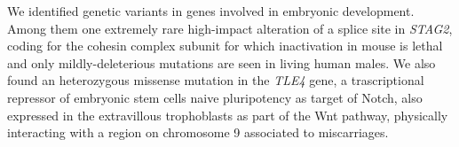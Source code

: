 \documentclass[fleqn,12pt]{wlscirep}
\begin{document}
We identified genetic variants in genes involved in embryonic development. Among them   
one extremely rare high-impact alteration of a splice site in \textit{STAG2}, coding %
for the cohesin complex subunit\cite{cuadrado2020specialized,mcnicoll2013cohesin}  for which  %
inactivation in mouse is lethal\cite{de2020essential} and only mildly-deleterious mutations are seen in living human males.\cite{mullegama2019mutations}  
We also found an heterozygous missense mutation in the \textit{TLE4} %
gene, %
a trascriptional repressor of
embryonic stem cells %
naive pluripotency as target of Notch,\cite{menchero2019transitions, laing2015gro} also expressed in the extravillous trophoblasts as part of the Wnt pathway,%
\cite{sonderegger2010wnt, meinhardt2014wnt} physically interacting with a region on chromosome 9 associated to miscarriages.\cite{laisk2019genetic}  
\end{document}
